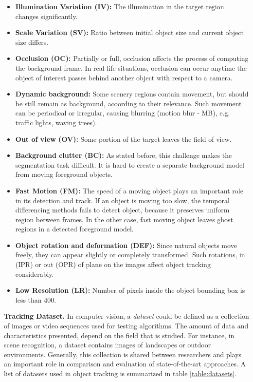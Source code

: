 \begin{itemize}
\item \textbf{Illumination Variation (IV):} The illumination in the target region
changes significantly.
\item \textbf{Scale Variation (SV):} Ratio between initial object size and
current object size differs.
\item \textbf{Occlusion (OC):} Partially or full, occlusion affects the process
of computing the background frame. In real life situations, occlusion can occur
anytime the object of interest passes behind another object with respect to a
camera.
\item \textbf{Dynamic background:} Some scenery regions contain movement, but
should be still remain as background, acoording to their relevance. Such
movement can be periodical or irregular, causing blurring (motion blur - MB),
e.g. traffic lights, waving trees).
\item \textbf{Out of view (OV): } Some portion of the target leaves the field
of view.
\item \textbf{Background clutter (BC):} As stated before, this challenge makes
the segmentation task difficult. It is hard to create a separate background
model from moving foreground objects.
\item \textbf{Fast Motion (FM):} The speed of a moving object plays an
important role in its detection and track. If an object is moving too slow,
the temporal differencing methods fails to detect object, because it preserves
uniform region between frames. In the other case, fast moving object leaves
ghost regions in a detected foreground model.
\item \textbf{Object rotation and deformation (DEF):} Since natural objects
move freely, they can appear slightly or completely transformed. Such
rotations, in (IPR) or out (OPR) of plane on the images affect object tracking
considerably.
\item \textbf{Low Resolution (LR):} Number of pixels inside the object
bounding box is less than 400.
\end{itemize}

\textbf{Tracking Dataset. } In computer vision, a \textit{dataset} could be
defined as a collection of
images or video sequences used for testing algorithms. The amount of data and
characteristics presented, depend on the field that is studied.
For instance, in scene recognition, a dataset contains images of landscapes or
outdoor environments. Generally, this collection is shared between researchers
and plays an important role in comparison and evaluation of state-of-the-art
approaches. A list of datasets used in object tracking is summarized in table
\ref{table:datasets}.

